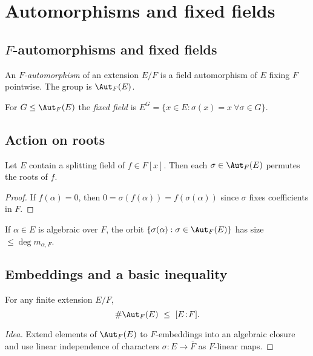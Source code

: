 \section{Automorphisms and fixed fields}

\subsection{$F$-automorphisms and fixed fields}
\begin{definition}
An \emph{$F$-automorphism} of an extension $E/F$ is a field automorphism of $E$ fixing $F$ pointwise. The group is $\Aut_F(E)$.
\end{definition}
\begin{definition}
For $G\le \Aut_F(E)$ the \emph{fixed field} is $E^G=\{x\in E:\sigma(x)=x\ \forall\sigma\in G\}$.
\end{definition}

\subsection{Action on roots}
\begin{proposition}\label{prop:permute-roots}
Let $E$ contain a splitting field of $f\in F[x]$. Then each $\sigma\in\Aut_F(E)$ permutes the roots of $f$.
\end{proposition}
\begin{proof}
If $f(\alpha)=0$, then $0=\sigma(f(\alpha))=f(\sigma(\alpha))$ since $\sigma$ fixes coefficients in $F$.
\end{proof}
\begin{proposition}
If $\alpha\in E$ is algebraic over $F$, the orbit $\{\sigma(\alpha):\sigma\in\Aut_F(E)\}$ has size $\le \deg m_{\alpha,F}$.
\end{proposition}

\subsection{Embeddings and a basic inequality}
\begin{theorem}\label{thm:auto-bound}
For any finite extension $E/F$,
\[
\#\Aut_F(E)\ \le\ [E\!:\!F].
\]
\end{theorem}
\begin{proof}[Idea]
Extend elements of $\Aut_F(E)$ to $F$-embeddings into an algebraic closure and use linear independence of characters $\sigma:E\to \overline{F}$ as $F$-linear maps.
\end{proof}

